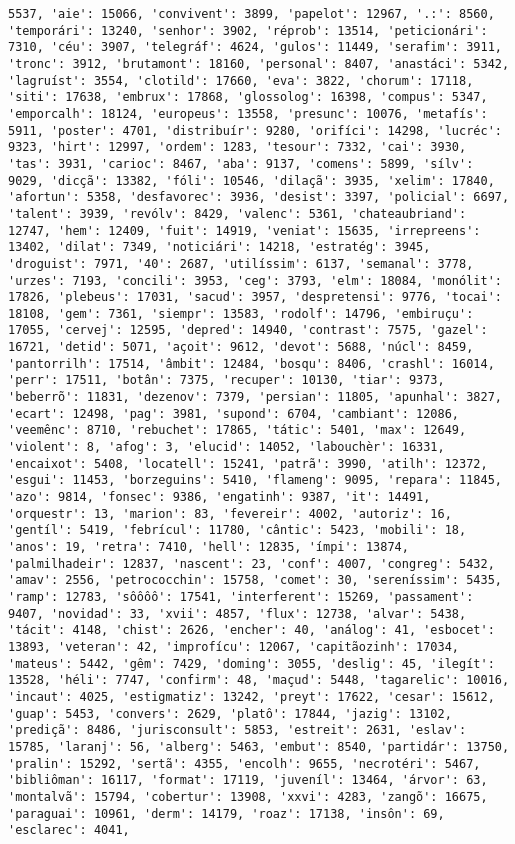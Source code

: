 \documentclass[11pt]{article}
\begin{document}
\begin{Verbatim}[commandchars=\\\{\}]
5537, 'aie': 15066, 'convivent': 3899, 'papelot': 12967, '.:': 8560, 'temporári': 13240, 'senhor': 3902, 'réprob': 13514, 'peticionári': 7310, 'céu': 3907, 'telegráf': 4624, 'gulos': 11449, 'serafim': 3911, 'tronc': 3912, 'brutamont': 18160, 'personal': 8407, 'anastáci': 5342, 'lagruíst': 3554, 'clotild': 17660, 'eva': 3822, 'chorum': 17118, 'siti': 17638, 'embrux': 17868, 'glossolog': 16398, 'compus': 5347, 'emporcalh': 18124, 'europeus': 13558, 'presunc': 10076, 'metafís': 5911, 'poster': 4701, 'distribuír': 9280, 'orifíci': 14298, 'lucréc': 9323, 'hirt': 12997, 'ordem': 1283, 'tesour': 7332, 'cai': 3930, 'tas': 3931, 'carioc': 8467, 'aba': 9137, 'comens': 5899, 'sílv': 9029, 'dicçã': 13382, 'fóli': 10546, 'dilaçã': 3935, 'xelim': 17840, 'afortun': 5358, 'desfavorec': 3936, 'desist': 3397, 'policial': 6697, 'talent': 3939, 'revólv': 8429, 'valenc': 5361, 'chateaubriand': 12747, 'hem': 12409, 'fuit': 14919, 'veniat': 15635, 'irrepreens': 13402, 'dilat': 7349, 'noticiári': 14218, 'estratég': 3945, 'droguist': 7971, '40': 2687, 'utilíssim': 6137, 'semanal': 3778, 'urzes': 7193, 'concili': 3953, 'ceg': 3793, 'elm': 18084, 'monólit': 17826, 'plebeus': 17031, 'sacud': 3957, 'despretensi': 9776, 'tocai': 18108, 'gem': 7361, 'siempr': 13583, 'rodolf': 14796, 'embiruçu': 17055, 'cervej': 12595, 'depred': 14940, 'contrast': 7575, 'gazel': 16721, 'detid': 5071, 'açoit': 9612, 'devot': 5688, 'núcl': 8459, 'pantorrilh': 17514, 'âmbit': 12484, 'bosqu': 8406, 'crashl': 16014, 'perr': 17511, 'botân': 7375, 'recuper': 10130, 'tiar': 9373, 'beberrõ': 11831, 'dezenov': 7379, 'persian': 11805, 'apunhal': 3827, 'ecart': 12498, 'pag': 3981, 'supond': 6704, 'cambiant': 12086, 'veemênc': 8710, 'rebuchet': 17865, 'tátic': 5401, 'max': 12649, 'violent': 8, 'afog': 3, 'elucid': 14052, 'labouchèr': 16331, 'encaixot': 5408, 'locatell': 15241, 'patrã': 3990, 'atilh': 12372, 'esgui': 11453, 'borzeguins': 5410, 'flameng': 9095, 'repara': 11845, 'azo': 9814, 'fonsec': 9386, 'engatinh': 9387, 'it': 14491, 'orquestr': 13, 'marion': 83, 'fevereir': 4002, 'autoriz': 16, 'gentíl': 5419, 'febrícul': 11780, 'cântic': 5423, 'mobili': 18, 'anos': 19, 'retra': 7410, 'hell': 12835, 'ímpi': 13874, 'palmilhadeir': 12837, 'nascent': 23, 'conf': 4007, 'congreg': 5432, 'amav': 2556, 'petrococchin': 15758, 'comet': 30, 'sereníssim': 5435, 'ramp': 12783, 'sôôôô': 17541, 'interferent': 15269, 'passament': 9407, 'novidad': 33, 'xvii': 4857, 'flux': 12738, 'alvar': 5438, 'tácit': 4148, 'chist': 2626, 'encher': 40, 'análog': 41, 'esbocet': 13893, 'veteran': 42, 'improfícu': 12067, 'capitãozinh': 17034, 'mateus': 5442, 'gêm': 7429, 'doming': 3055, 'deslig': 45, 'ilegít': 13528, 'héli': 7747, 'confirm': 48, 'maçud': 5448, 'tagarelic': 10016, 'incaut': 4025, 'estigmatiz': 13242, 'preyt': 17622, 'cesar': 15612, 'guap': 5453, 'convers': 2629, 'platô': 17844, 'jazig': 13102, 'prediçã': 8486, 'jurisconsult': 5853, 'estreit': 2631, 'eslav': 15785, 'laranj': 56, 'alberg': 5463, 'embut': 8540, 'partidár': 13750, 'pralin': 15292, 'sertã': 4355, 'encolh': 9655, 'necrotéri': 5467, 'bibliôman': 16117, 'format': 17119, 'juveníl': 13464, 'árvor': 63, 'montalvã': 15794, 'cobertur': 13908, 'xxvi': 4283, 'zangõ': 16675, 'paraguai': 10961, 'derm': 14179, 'roaz': 17138, 'insôn': 69, 'esclarec': 4041, 
\end{Verbatim}
\end{document}
